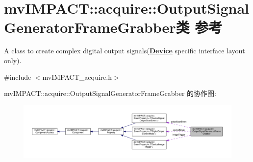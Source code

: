\hypertarget{classmv_i_m_p_a_c_t_1_1acquire_1_1_output_signal_generator_frame_grabber}{\section{mv\+I\+M\+P\+A\+C\+T\+:\+:acquire\+:\+:Output\+Signal\+Generator\+Frame\+Grabber类 参考}
\label{classmv_i_m_p_a_c_t_1_1acquire_1_1_output_signal_generator_frame_grabber}
}


A class to create complex digital output signals({\bfseries \hyperlink{classmv_i_m_p_a_c_t_1_1acquire_1_1_device}{Device}} specific interface layout only).  




{\ttfamily \#include $<$mv\+I\+M\+P\+A\+C\+T\+\_\+acquire.\+h$>$}



mv\+I\+M\+P\+A\+C\+T\+:\+:acquire\+:\+:Output\+Signal\+Generator\+Frame\+Grabber 的协作图\+:
\nopagebreak
\begin{figure}[H]
\begin{center}
\leavevmode
\includegraphics[width=350pt]{classmv_i_m_p_a_c_t_1_1acquire_1_1_output_signal_generator_frame_grabber__coll__graph}
\end{center}
\end{figure}
